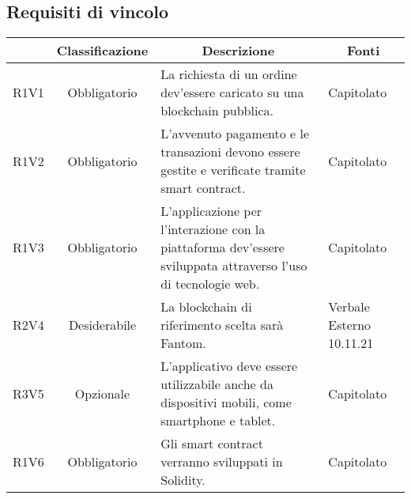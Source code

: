 \subsection{Requisiti di vincolo} \label{subsection:requisiti_vincolo}
\begin{table}[H]
    \centering
    \renewcommand{\arraystretch}{1.8}
    \begin{tabular}{c | c | p{6cm} | p{4.1cm}}
        \rowcolor[HTML]{125E28}
        \multicolumn{1}{c}{\color[HTML]{FFFFFF} \textbf{Codice}}          &
        \multicolumn{1}{c}{\color[HTML]{FFFFFF} \textbf{Classificazione}} &
        \multicolumn{1}{c}{\color[HTML]{FFFFFF} \textbf{Descrizione}}     &
        \multicolumn{1}{c}{\color[HTML]{FFFFFF} \textbf{Fonti}}                                                                                                                                                                     \\
        \hline
        R1V1                                                              & Obbligatorio & La richiesta di un ordine dev'essere caricato su una blockchain\glo{} pubblica.                               & Capitolato               \\
        R1V2                                                              & Obbligatorio & L'avvenuto pagamento e le transazioni devono essere gestite e verificate tramite smart contract\glo{}.        & Capitolato               \\
        R1V3                                                              & Obbligatorio & L'applicazione per l'interazione con la piattaforma dev'essere sviluppata attraverso l'uso di tecnologie web. & Capitolato               \\
        R2V4                                                              & Desiderabile & La blockchain\glo{} di riferimento scelta sarà Fantom\glo{}.                                                  & Verbale Esterno 10.11.21 \\
        R3V5                                                              & Opzionale    & L'applicativo deve essere utilizzabile anche da dispositivi mobili, come smartphone e tablet.                 & Capitolato               \\
        R1V6                                                              & Obbligatorio & Gli smart contract\glo{} verranno sviluppati in Solidity\glo{}.                                               & Capitolato               \\

\end{tabular}
\end{table}
